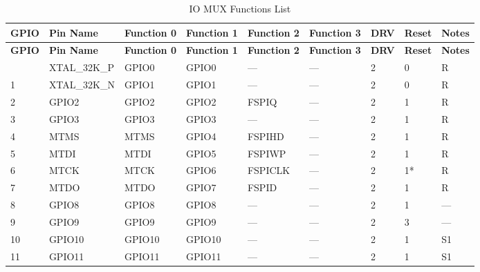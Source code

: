 
   \begin{longtable}[c]{|p{0.7cm}|p{1.9cm}|p{1.9cm}|p{1.9cm}|p{1.9cm}|p{1.9cm}|p{1cm}|p{1cm}|p{1.2cm}| }
   \caption{IO MUX Functions List}
    \label{table:iomux_pads} \\
        \hline
        \rowcolor{lightgray}
\textbf{GPIO} & \textbf{Pin Name} & \textbf{Function 0} & \textbf{Function 1} & \textbf{Function 2} & \textbf{Function 3} & \textbf{DRV} & \textbf{Reset} & \textbf{Notes} \\
 \hline
\endfirsthead
        \hline
        \rowcolor{lightgray}
        \textbf{GPIO} & \textbf{Pin Name} & \textbf{Function 0} & \textbf{Function 1} & \textbf{Function 2} & \textbf{Function 3} & \textbf{DRV} & \textbf{Reset} & \textbf{Notes} \\
        \hline
        \endhead
        \endfoot
0 & XTAL\_32K\_P     & GPIO0         & GPIO0   & ---          & ---            & 2           & 0 & R \\ \hline
1 & XTAL\_32K\_N     & GPIO1         & GPIO1   & ---          & ---            & 2           & 0 & R \\ \hline
2 & GPIO2            & GPIO2         & GPIO2   & FSPIQ      & ---            & 2           & 1 & R \\ \hline
3 & GPIO3            & GPIO3         & GPIO3   & ---          & ---            & 2           & 1 & R \\ \hline
4 & MTMS             & MTMS          & GPIO4   & FSPIHD     & ---            & 2           & 1 & R \\ \hline
5 & MTDI             & MTDI          & GPIO5   & FSPIWP     & ---            & 2           & 1 & R \\ \hline
6 & MTCK             & MTCK          & GPIO6   & FSPICLK    & ---            & 2           & 1* & R \\ \hline
7 & MTDO             & MTDO          & GPIO7   & FSPID      & ---            & 2           & 1 & R \\ \hline
8 & GPIO8            & GPIO8         & GPIO8   & ---          & ---            & 2           & 1 & --- \\ \hline
9 & GPIO9            & GPIO9         & GPIO9   & ---          & ---            & 2           & 3 & --- \\ \hline
10 & GPIO10          & GPIO10        & GPIO10  & ---          & ---            & 2           & 1 & S1 \\ \hline
11 & GPIO11          & GPIO11        & GPIO11  & ---          & ---            & 2           & 1 & S1 \\ \hline

\end{longtable}
